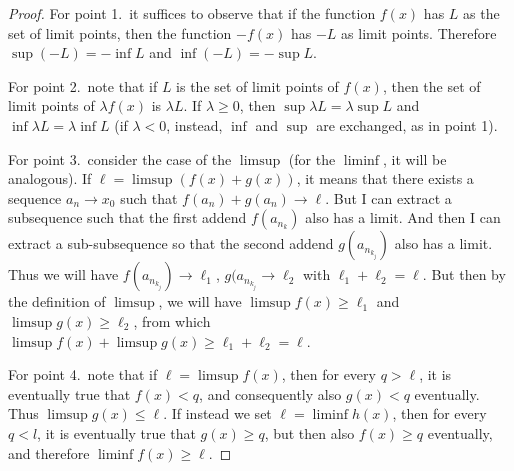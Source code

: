 \begin{proof}
  For point 1.\ it suffices to observe that if the function $f(x)$ has $L$ as
  the set of limit points, then the function $-f(x)$ has $-L$ as limit
  points. Therefore $\sup (-L) = -\inf L$ and $\inf(-L) = -\sup L$.

  For point 2.\ note that if $L$ is the set of limit points
  of $f(x)$, then the set of limit points of $\lambda f(x)$ is $\lambda L$.
  If $\lambda \ge 0$, then $\sup \lambda L = \lambda \sup L$
    and $\inf \lambda L = \lambda \inf L$ (if $\lambda<0$, instead, $\inf$ and
  $\sup$
  are exchanged, as in point 1).

    For point 3.\ consider the case of the $\limsup$ (for the $\liminf$, it will
  be analogous).
  If $\ell = \limsup(f(x)+g(x))$, it means that there exists a sequence
  $a_n\to x_0$ such that $f(a_n)+g(a_n)\to \ell$. 
  But I can extract a subsequence
  such that the first addend $f(a_{n_k})$ also has a limit. 
  And then I can extract
  a sub-subsequence so that the second addend $g(a_{n_{k_j}})$
  also has a limit. 
  Thus we will have $f(a_{n_{k_j}}) \to \ell_1$, $g(a_{n_{k_j}} \to \ell_2$
  with $\ell_1+\ell_2=\ell$.
    But then by the definition of $\limsup$, we will have $\limsup f(x) \ge
  \ell_1$
    and $\limsup g(x) \ge \ell_2$, from which $\limsup f(x) + \limsup g(x) \ge
  \ell_1+\ell_2 = \ell$.

  For point 4.\ note that if $\ell = \limsup f(x)$, then
  for every $q>\ell$, it is eventually true that
  $f(x)<q$, and consequently also $g(x) < q$ eventually.
  Thus $\limsup g(x) \le \ell$.
  If instead we set $\ell = \liminf h(x)$, then
  for every $q<l$, it is eventually true that $g(x) \ge q$, but
  then also $f(x)\ge q$ eventually, and therefore
  $\liminf f(x) \ge \ell$.
\end{proof}
    
